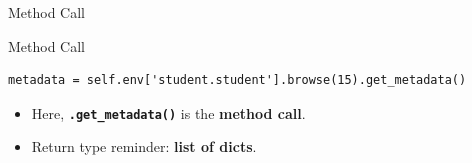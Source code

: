 \begin{frame}[fragile]{Method Call}
\begin{block}{Method Call}
\begin{lstlisting}
metadata = self.env['student.student'].browse(15).get_metadata()
\end{lstlisting}
	\begin{itemize}
		\item Here, \textbf{\texttt{.get\_metadata()}} is the \textbf{method call}.
		\item Return type reminder: \textbf{list of dicts}.
	\end{itemize}
\end{block}
\end{frame}
